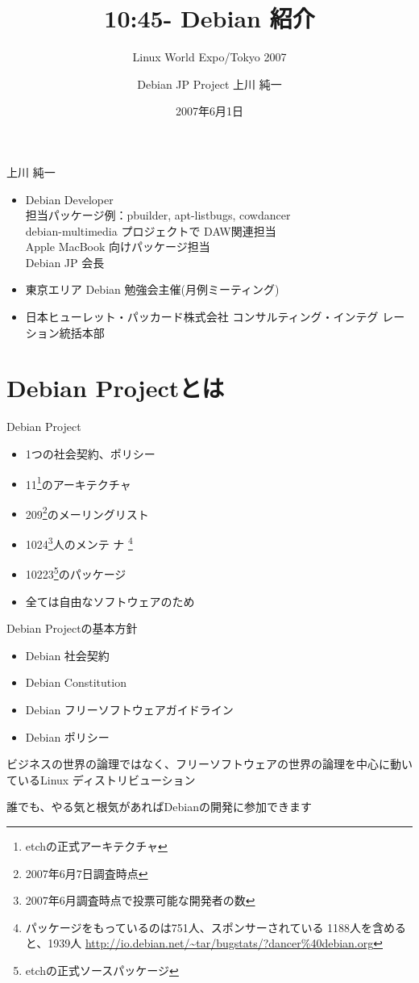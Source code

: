 \documentclass[cjk,dvipdfmx,12pt]{beamer}
\title{10:45- Debian 紹介}
\subtitle{Linux World Expo/Tokyo 2007}
\author{Debian JP Project 上川 純一}
\date{2007年6月1日}
\begin{document}
\frame{\titlepage{}}


\begin{frame}{上川 純一}
 \begin{itemize}
  \item Debian Developer\\ 
	
	担当パッケージ例：pbuilder, apt-listbugs, cowdancer \\
	debian-multimedia プロジェクトで DAW関連担当\\
	Apple MacBook 向けパッケージ担当\\
	Debian JP 会長
	
  \item 東京エリア Debian 勉強会主催(月例ミーティング)
	
  \item 日本ヒューレット・パッカード株式会社 コンサルティング・インテグ
	レーション統括本部 

 \end{itemize}
\end{frame}


\section{Debian Projectとは}
\begin{frame}{Debian Project}
 \begin{itemize}%
  \item 1つの社会契約、ポリシー
  \item 11\footnote{etchの正式アーキテクチャ}のアーキテクチャ 
  \item 209\footnote{2007年6月7日調査時点}のメーリングリスト
  \item 1024\footnote{2007年6月調査時点で投票可能な開発者の数}人のメンテ
	ナ
	\footnote{パッケージをもっているのは751人、スポンサーされている
	1188人を含めると、1939人 \url{http://io.debian.net/~tar/bugstats/?dancer\%40debian.org}}
  \item 10223\footnote{etchの正式ソースパッケージ}のパッケージ
  \item 全ては自由なソフトウェアのため
 \end{itemize}
\end{frame}

\begin{frame}{Debian Projectの基本方針}
 \begin{itemize}
  \item Debian 社会契約
  \item Debian Constitution
  \item Debian フリーソフトウェアガイドライン
  \item Debian ポリシー
 \end{itemize}

ビジネスの世界の論理ではなく、フリーソフトウェアの世界の論理を中心に動い
ているLinux ディストリビューション

誰でも、やる気と根気があればDebianの開発に参加できます

\end{frame}
\end{document}
